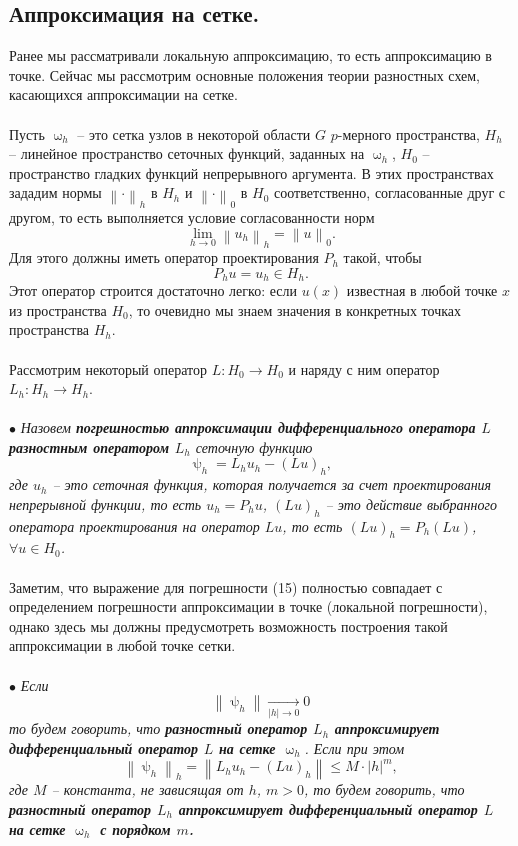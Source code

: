 \documentclass[a4paper, 12pt]{report}
\numberwithin{equation}{section}
\renewcommand{\leq}{\leqslant}
\renewcommand{\psi}{\uppsi}
\renewcommand{\omega}{\upomega}
\newcommand\Norm[1]{\left\| #1 \right\|}
\begin{document}
\subsection{Аппроксимация на сетке.}
Ранее мы рассматривали локальную аппроксимацию, то есть аппроксимацию в точке. Сейчас мы рассмотрим основные положения теории разностных схем, касающихся аппроксимации на сетке.\\\\
Пусть $\omega_h$ -- это сетка узлов в некоторой области $G$ $p$-мерного пространства, $H_h$ -- линейное пространство сеточных функций, заданных на $\omega_h$, $H_0$ -- пространство гладких функций непрерывного аргумента. В этих пространствах зададим нормы $\Norm{\cdot}_h$ в $H_h$ и $\Norm{\cdot}_0$ в $H_0$ соответственно, согласованные друг с другом, то есть выполняется условие согласованности норм
$$\lim\limits_{h\to 0}\Norm{u_h}_h = \Norm{u}_0.$$
Для этого должны иметь оператор проектирования $P_h$ такой, чтобы $$P_hu = u_h \in H_h.$$
Этот оператор строится достаточно легко: если $u(x)$ известная в любой точке $x$ из пространства $H_0$, то очевидно мы знаем значения в конкретных точках пространства $H_h$.\\\\
Рассмотрим некоторый оператор $L: H_0 \to H_0$ и наряду с ним оператор $L_h : H_h \to H_h$.\\\\
$\bullet$ \textit{Назовем \textbf{погрешностью аппроксимации дифференциального оператора $L$ разностным оператором $L_h$} сеточную функцию}
\begin{equation}
\psi_h = L_hu_h - (Lu)_h,
\end{equation}
\textit{где $u_h$ -- это сеточная функция, которая получается за счет проектирования непрерывной функции, то есть $u_h = P_hu$, $(Lu)_h$ -- это действие выбранного оператора проектирования на оператор $Lu$, то есть $(Lu)_h = P_h(Lu)$, $\forall u \in H_0$.}
\\\\
Заметим, что выражение для погрешности (15) полностью совпадает с определением погрешности аппроксимации в точке (локальной погрешности), однако здесь мы должны предусмотреть возможность построения такой аппроксимации в любой точке сетки.\\\\
$\bullet$ \textit{Если $$\Norm{\psi_h}\xrightarrow[|h|\to 0]{}0$$ то будем говорить, что \textbf{разностный оператор $L_h$ аппроксимирует дифференциальный оператор $L$ на сетке $\omega_h$}. Если при этом \begin{equation}
	\Norm{\psi_h}_h = \Norm{L_hu_h - (Lu)_h} \leq M \cdot |h|^m,
\end{equation} где $M$ -- константа, не зависящая от $h$, $m>0$, то будем говорить, что \textbf{разностный оператор $L_h$ аппроксимирует дифференциальный оператор $L$ на сетке $\omega_h$ с порядком $m$.}}
\end{document}
